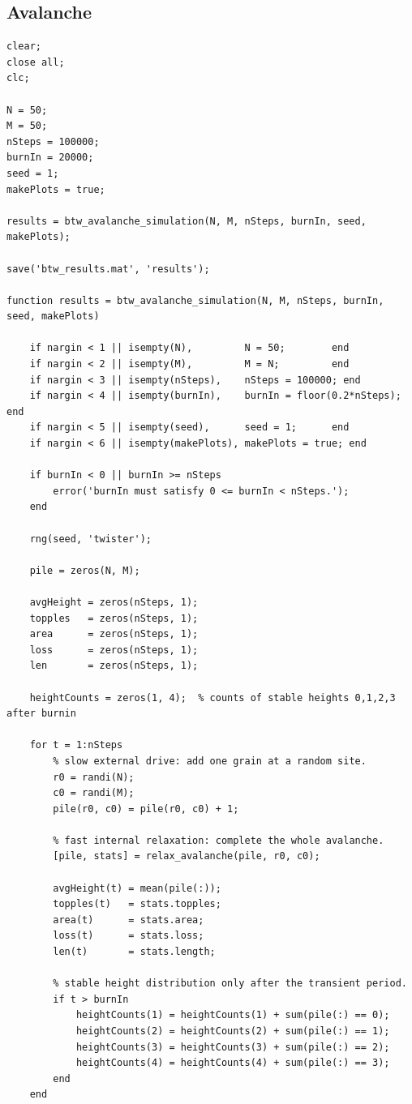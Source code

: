 \documentclass{article}
\begin{document}
\subsection{Avalanche}
\begin{lstlisting}
clear; 
close all; 
clc;

N = 50;
M = 50;
nSteps = 100000;
burnIn = 20000;
seed = 1;
makePlots = true;

results = btw_avalanche_simulation(N, M, nSteps, burnIn, seed, makePlots);

save('btw_results.mat', 'results');

function results = btw_avalanche_simulation(N, M, nSteps, burnIn, seed, makePlots)

    if nargin < 1 || isempty(N),         N = 50;        end
    if nargin < 2 || isempty(M),         M = N;         end
    if nargin < 3 || isempty(nSteps),    nSteps = 100000; end
    if nargin < 4 || isempty(burnIn),    burnIn = floor(0.2*nSteps); end
    if nargin < 5 || isempty(seed),      seed = 1;      end
    if nargin < 6 || isempty(makePlots), makePlots = true; end

    if burnIn < 0 || burnIn >= nSteps
        error('burnIn must satisfy 0 <= burnIn < nSteps.');
    end

    rng(seed, 'twister');

    pile = zeros(N, M);

    avgHeight = zeros(nSteps, 1);
    topples   = zeros(nSteps, 1);
    area      = zeros(nSteps, 1);
    loss      = zeros(nSteps, 1);
    len       = zeros(nSteps, 1);

    heightCounts = zeros(1, 4);  % counts of stable heights 0,1,2,3 after burnin

    for t = 1:nSteps
        % slow external drive: add one grain at a random site.
        r0 = randi(N);
        c0 = randi(M);
        pile(r0, c0) = pile(r0, c0) + 1;

        % fast internal relaxation: complete the whole avalanche.
        [pile, stats] = relax_avalanche(pile, r0, c0);

        avgHeight(t) = mean(pile(:));
        topples(t)   = stats.topples;
        area(t)      = stats.area;
        loss(t)      = stats.loss;
        len(t)       = stats.length;

        % stable height distribution only after the transient period.
        if t > burnIn
            heightCounts(1) = heightCounts(1) + sum(pile(:) == 0);
            heightCounts(2) = heightCounts(2) + sum(pile(:) == 1);
            heightCounts(3) = heightCounts(3) + sum(pile(:) == 2);
            heightCounts(4) = heightCounts(4) + sum(pile(:) == 3);
        end
    end


\end{lstlisting}
\end{document}
